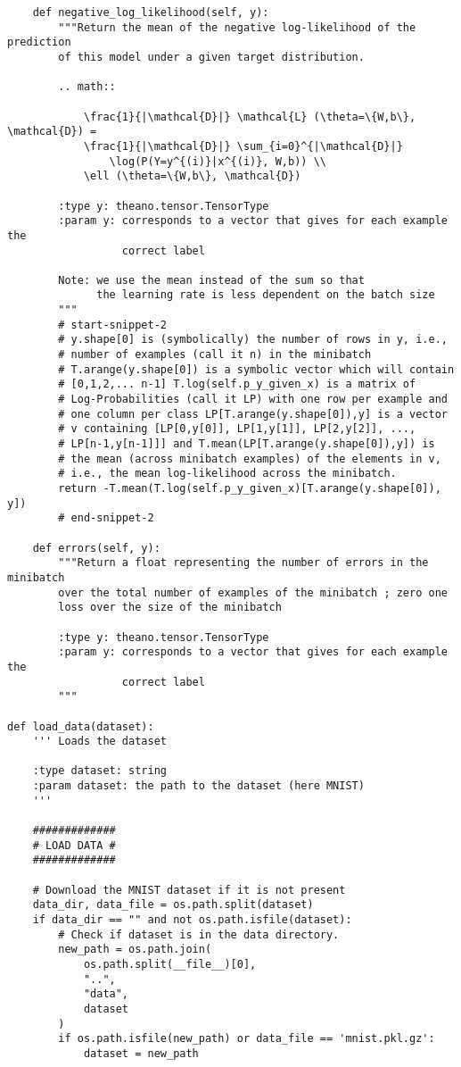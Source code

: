 \documentclass[12pt]{article}
\begin{document}
\begin{lstlisting}
    def negative_log_likelihood(self, y):
        """Return the mean of the negative log-likelihood of the prediction
        of this model under a given target distribution.

        .. math::

            \frac{1}{|\mathcal{D}|} \mathcal{L} (\theta=\{W,b\}, \mathcal{D}) =
            \frac{1}{|\mathcal{D}|} \sum_{i=0}^{|\mathcal{D}|}
                \log(P(Y=y^{(i)}|x^{(i)}, W,b)) \\
            \ell (\theta=\{W,b\}, \mathcal{D})

        :type y: theano.tensor.TensorType
        :param y: corresponds to a vector that gives for each example the
                  correct label

        Note: we use the mean instead of the sum so that
              the learning rate is less dependent on the batch size
        """
        # start-snippet-2
        # y.shape[0] is (symbolically) the number of rows in y, i.e.,
        # number of examples (call it n) in the minibatch
        # T.arange(y.shape[0]) is a symbolic vector which will contain
        # [0,1,2,... n-1] T.log(self.p_y_given_x) is a matrix of
        # Log-Probabilities (call it LP) with one row per example and
        # one column per class LP[T.arange(y.shape[0]),y] is a vector
        # v containing [LP[0,y[0]], LP[1,y[1]], LP[2,y[2]], ...,
        # LP[n-1,y[n-1]]] and T.mean(LP[T.arange(y.shape[0]),y]) is
        # the mean (across minibatch examples) of the elements in v,
        # i.e., the mean log-likelihood across the minibatch.
        return -T.mean(T.log(self.p_y_given_x)[T.arange(y.shape[0]), y])
        # end-snippet-2

    def errors(self, y):
        """Return a float representing the number of errors in the minibatch
        over the total number of examples of the minibatch ; zero one
        loss over the size of the minibatch

        :type y: theano.tensor.TensorType
        :param y: corresponds to a vector that gives for each example the
                  correct label
        """

def load_data(dataset):
    ''' Loads the dataset

    :type dataset: string
    :param dataset: the path to the dataset (here MNIST)
    '''

    #############
    # LOAD DATA #
    #############

    # Download the MNIST dataset if it is not present
    data_dir, data_file = os.path.split(dataset)
    if data_dir == "" and not os.path.isfile(dataset):
        # Check if dataset is in the data directory.
        new_path = os.path.join(
            os.path.split(__file__)[0],
            "..",
            "data",
            dataset
        )
        if os.path.isfile(new_path) or data_file == 'mnist.pkl.gz':
            dataset = new_path


\end{lstlisting}
\end{document}
